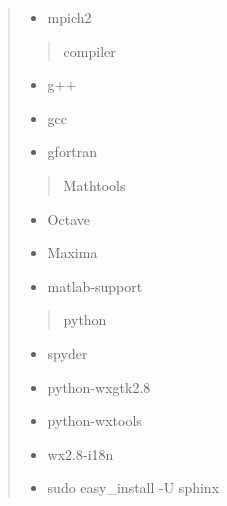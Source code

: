 \documentclass[letterpaper,10pt,english]{sphinxmanual}
\begin{document}
\begin{quote}
\begin{description}
\begin{itemize}
\item {} 
mpich2

\end{itemize}
\begin{quote}\begin{description}
\item[{compiler}] \leavevmode
\end{description}\end{quote}
\begin{itemize}\setlength{\itemsep}{0pt}\setlength{\parskip}{0pt}
\item {} 
g++

\item {} 
gcc

\item {} 
gfortran

\end{itemize}
\begin{quote}\begin{description}
\item[{Mathtools}] \leavevmode
\end{description}\end{quote}
\begin{itemize}\setlength{\itemsep}{0pt}\setlength{\parskip}{0pt}
\item {} 
Octave

\item {} 
Maxima

\item {} 
matlab-support

\end{itemize}
\begin{quote}\begin{description}
\item[{python}] \leavevmode
\end{description}\end{quote}
\begin{itemize}\setlength{\itemsep}{0pt}\setlength{\parskip}{0pt}
\item {} 
spyder

\item {} 
python-wxgtk2.8

\item {} 
python-wxtools

\item {} 
wx2.8-i18n

\item {} 
sudo easy\_install -U sphinx

\end{itemize}

\end{description}\end{quote}
\end{document}
